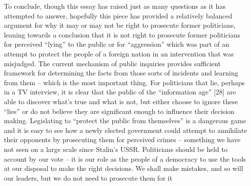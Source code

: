 \documentclass[11pt,a4paper]{report}
\newcounter{count}
\begin{document}
\begin{multicols}{2}
		To conclude, though this essay has raised just as many questions as it has attempted to answer, hopefully this piece has provided a relatively balanced argument for why it may or may not be right to prosecute former politicians, leaning towards a conclusion that it is not right to prosecute former politicians for perceived “lying” to the public or for “aggression” which was part of an attempt to protect the people of a foreign nation in an intervention that was misjudged. The current mechanism of public inquiries provides sufficient framework for determining the facts from those sorts of incidents and learning from them – which is the most important thing. For politicians that lie, perhaps in a TV interview, it is clear that the public of the “information age” [28] are able to discover what’s true and what is not, but either choose to ignore these “lies” or do not believe they are significant enough to influence their decision making. Legislating to “protect the public from themselves” is a dangerous game and it is easy to see how a newly elected government could attempt to annihilate their opponents by prosecuting them for perceived crimes – something we have not seen on a large scale since Stalin’s USSR. Politicians should be held to account by our vote – it is our role as the people of a democracy to use the tools at our disposal to make the right decisions. We shall make mistakes, and so will our leaders, but we do not need to prosecute them for it
		
	\end{multicols}
	
\end{document}
